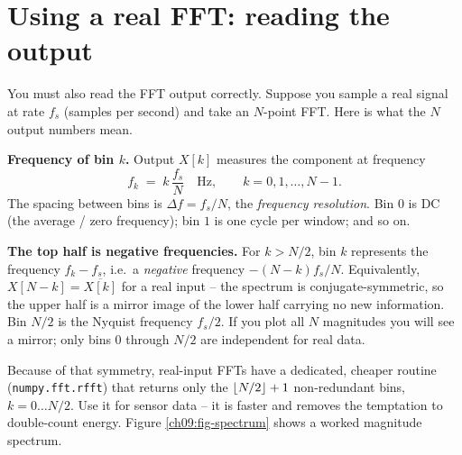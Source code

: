 \section{Using a real FFT: reading the output}
\label{ch09:reading}

You must also read the FFT output correctly. Suppose you sample a real signal at rate
$f_s$ (samples per second) and take an $N$-point FFT. Here is what the $N$ output numbers
mean.

\begin{focusbox}
\textbf{Frequency of bin $k$.} Output $X[k]$ measures the component at frequency
\begin{equation}
\label{ch09:bin-freq}
f_k \;=\; k\,\frac{f_s}{N} \quad\text{Hz}, \qquad k = 0, 1, \dots, N-1 .
\end{equation}
The spacing between bins is $\Delta f = f_s/N$, the \emph{frequency resolution}. Bin $0$
is DC (the average / zero frequency); bin $1$ is one cycle per window; and so on.
\end{focusbox}

\begin{trapbox}
\textbf{The top half is negative frequencies.} For $k > N/2$, bin $k$ represents the
frequency $f_k - f_s$, i.e.\ a \emph{negative} frequency $-(N-k)f_s/N$. Equivalently,
$X[N-k] = \overline{X[k]}$ for a real input -- the spectrum is conjugate-symmetric, so
the upper half is a mirror image of the lower half carrying no new information. Bin
$N/2$ is the Nyquist frequency $f_s/2$. If you plot all $N$ magnitudes you will see a
mirror; only bins $0$ through $N/2$ are independent for real data.
\end{trapbox}

Because of that symmetry, real-input FFTs have a dedicated, cheaper routine
(\texttt{numpy.fft.rfft}) that returns only the $\lfloor N/2\rfloor + 1$ non-redundant bins,
$k = 0 \dots N/2$. Use it for sensor data -- it is faster and removes the temptation to
double-count energy. Figure \ref{ch09:fig-spectrum} shows a worked magnitude spectrum.

